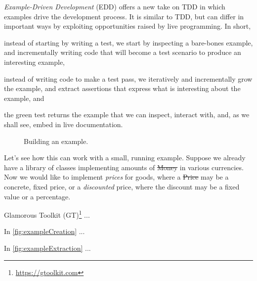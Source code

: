 \documentclass[sigplan,anonymous,review,10pt]{acmart}
\begin{document}
\emph{Example-Driven Development} (EDD) offers a new take on TDD in which examples drive the development process.
It is similar to TDD, but can differ in important ways by exploiting opportunities raised by live programming.
In short,
\begin{inparaenum}[(i)]
	\item instead of starting by writing a test, we start by inspecting a bare-bones example, and incrementally writing code that will become a test scenario to produce an interesting example,
	\item instead of writing code to make a test pass, we iteratively and incrementally grow the example, and extract assertions that express what is interesting about the example,
and
	\item the green test returns the example that we can inspect, interact with, and, as we shall see, embed in live documentation.
\end{inparaenum}

\begin{figure}[ht]
\centering
{}\qquad
{}\qquad
{}\qquad
{}\qquad
  \caption{Building an example.}
  \label{fig:exampleCreation}
\end{figure}

Let's see how this can work with a small, running example.
Suppose we already have a library of classes implementing amounts of \st{Money} in various currencies.
Now we would like to implement \emph{prices} for goods, where a \st{Price} may be a concrete, fixed price, or a \emph{discounted} price, where the discount may be a fixed value or a percentage.

\here


Glamorous Toolkit (GT)\footnote{\url{https://gtoolkit.com}} ...

In \autoref{fig:exampleCreation} ...


In \autoref{fig:exampleExtraction} ...


\end{document}
